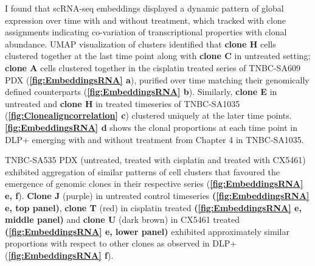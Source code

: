  I found that scRNA-seq embeddings displayed a dynamic pattern of global expression over time with and without treatment, which tracked with clone assignments indicating co-variation of transcriptional properties with clonal abundance. UMAP visualization of clusters identified that \textbf{clone H} cells clustered together at the last time point along with \textbf{clone C} in untreated setting; \textbf{clone A} cells clustered together in the cisplatin treated series of TNBC-SA609 PDX (\textbf{\autoref{fig:EmbeddingsRNA} a}), purified over time matching their genomically defined counterparts (\textbf{\autoref{fig:EmbeddingsRNA} b}). Similarly, \textbf{clone E} in untreated and \textbf{clone H} in treated timeseries of TNBC-SA1035  (\textbf{\autoref{fig:Clonealigncorrelation} c}) clustered uniquely at the later time points. \textbf{\autoref{fig:EmbeddingsRNA} d} shows the clonal proportions at each time point in DLP+ emerging with and without treatment from Chapter 4 in TNBC-SA1035. 

TNBC-SA535 PDX (untreated, treated with cisplatin and treated with CX5461) exhibited aggregation of similar patterns of cell clusters that favoured the emergence of genomic clones in their respective series (\textbf{\autoref{fig:EmbeddingsRNA} e, f}). \textbf{Clone J} (purple) in untreated control timeseries \textbf{(\autoref{fig:EmbeddingsRNA} e, top panel)}, \textbf{clone T} (red) in cisplatin treated \textbf{(\autoref{fig:EmbeddingsRNA} e, middle panel)} and \textbf{clone U} (dark brown) in CX5461 treated \textbf{(\autoref{fig:EmbeddingsRNA} e, lower panel)} exhibited approximately similar proportions with respect to other clones as observed in DLP+ (\textbf{\autoref{fig:EmbeddingsRNA} f}). 

  
 
